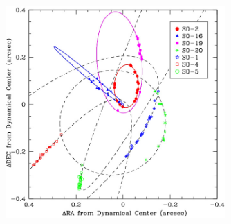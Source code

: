 \documentclass[solutions]{esg8012pset}
\begin{document}
    \begin{figure}[!h] \label{fig:orbits}
      \begin{center}\includegraphics[width=0.75\textwidth]{ps10_4}\end{center}
    \end{figure}
\end{document}
